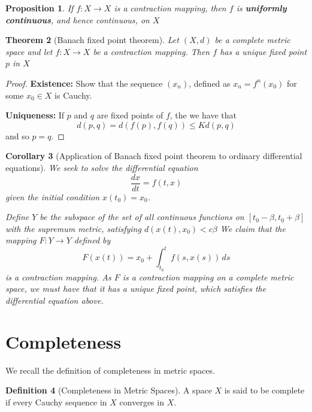 \documentclass[10pt, oneside, reqno]{amsart}
\theoremstyle{plain}%
\newtheorem{thm}{Theorem}[section]
\newtheorem{prop}[thm]{Proposition}
\newtheorem{cor}[thm]{Corollary}
\theoremstyle{definition}
\newtheorem{defn}[thm]{Definition}
\theoremstyle{remark}
\newcommand{\met}{(X,d)}
\begin{document}
\begin{prop}
	If $f: X \rightarrow X$ is a contraction mapping, then $f$ is \textbf{uniformly continuous}, and hence continuous, on $X$
\end{prop}



\begin{thm}[Banach fixed point theorem]
	Let $\met$ be a complete metric space and let $f: X \rightarrow X$ be a contraction mapping.  Then $f$ has a unique fixed point $p$ in $X$
\end{thm}

\begin{proof}
	\textbf{Existence:} Show that the sequence $(x_n)$, defined as $x_n = f^n(x_0)$ for some $x_0 \in X$ is Cauchy.
	
	\textbf{Uniqueness:} If $p$ and $q$ are fixed points of $f$, the we have that \[
			d(p,q) = d(f(p), f(q)) \leq K d(p,q)
			\] and so $p = q$.
\end{proof}

\begin{cor}[Application of Banach fixed point theorem to ordinary differential equations]
	We seek to solve the differential equation \[
		\frac{dx}{dt} = f(t,x)
	\] given the initial condition $x(t_0) = x_0$.
	
	Define $Y$ be the subspace of the set of all continuous functions on $[t_0 - \beta, t_0 + \beta]$ with the supremum metric, satisfying $d(x(t), x_0) < c \beta$
	We claim that the mapping $F: Y \rightarrow Y$ defined by\[
		F(x(t)) = x_0 + \int_{t_0}^t f(s, x(s)) \, ds
	\] is a contraction mapping.  As $F$ is a contraction mapping on a complete metric space, we must have that it has a unique fixed point, which satisfies the differential equation above.
\end{cor}


\section{Completeness} %
\label{sec:completeness}

We recall the definition of completeness in metric spaces.

\begin{defn}[Completeness in Metric Spaces]
A space $X$ is said to be complete if every Cauchy sequence in $X$ converges in $X$.
\end{defn}
\end{document}
